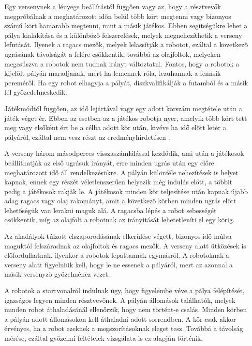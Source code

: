 Egy versenynek a lényege beállítástól függően vagy az, hogy a résztvevők megpróbálnak a meghatározott időn belül több kört megtenni vagy bizonyos számú kört hamarabb megtenni, mint a másik játékos. Ebben segítségükre lehet a pálya kialakítása és a különböző felszerelések, melyek megnehezíthetik a verseny lefutását. Ilyenek a ragacs mezők, melyek lelassítják a robotot, ezáltal a következő ugrásának távolságát a felére csökkentik, továbbá az olajfoltok, melyeken megcsúszva a robotok nem tudnak irányt változtatni. Fontos, hogy a robotok a kijelölt pályán maradjanak, mert ha lemennek róla, lezuhannak a fennsík pereméről. Ha egy robot elhagyja a pályát, diszkvalifikálják a futamból és a másik fél győzedelmeskedik.


Játékmódtól függően, az idő lejártával vagy egy adott körszám megtétele után a játék véget ér. Ebben az esetben az a játékos robotja nyer, amelyik több kört tett meg vagy elsőként ért be a célba adott kör után, kivéve ha idő előtt letér a pályáról, ezáltal nem vesz részt az eredményhirdetésen .


A verseny három másodperces visszaszámlálással kezdődik, ami után a játékosok beállíthatják az első ugrásuk irányát, erre minden ugrás után egy előre meghatározott idő áll rendelkezésükre. A pályán különféle nehezítések is helyet kapnak, ennek egy részét véletlenszerűen helyezik még indulás előtt, a többit pedig a játékosok rakják le. A játékosok minden kör teljesítése után kapnak újabb adag ragacs vagy olaj rakományt, amit a következő körben minden ugrás előtt lehetőségük van lerakni maguk alá. A ragacsba lépés a robot sebességét csökkentik, míg az olajfolt a robotnak az irányítását lehetetleníti el egy körig. 

Az akadályok túlzott elszaporodásának elkerülése végett, bizonyos idő múlva maguktól felszáradnak az olajfoltok és ragacs mezők.  A verseny alatt ütközések is előfordulhatnak, ilyenkor a robotok lepattannak egymásról. A robotoknak a verseny alatt figyelniük kell, hogy le ne essenek a pályáról, mert az azonnal a másik versenyző győzelméhez vezet.

A robotok a startvonalról indulnak úgy, hogy figyelembe véve a pálya felépítését, igazságos legyen minden résztvevőnek. A pályán állomások találhatók, melyek minden robot áthaladásánál ellenőrzik, hogy nem történt-e csalás. Minden körben a pályán adott állomásokon kell áthaladni adott sorrendben. A kör csak akkor érvényes, ha a robot ezeknek a megszorításoknak eleget tesz. Továbbá a távolság mérése, ezáltal győzelmi feltételek vizsgálata is ez alapján történik.


